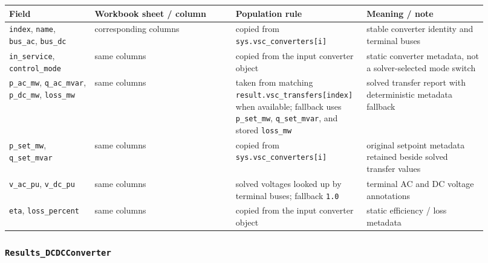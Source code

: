 \begin{longtable}{@{}L{0.17\linewidth}L{0.29\linewidth}L{0.22\linewidth}L{0.24\linewidth}@{}}
\toprule
Field & Workbook sheet / column & Population rule & Meaning / note \\
\midrule
\endhead
\texttt{index}, \texttt{name}, \texttt{bus\_ac}, \texttt{bus\_dc} & corresponding columns & copied from \texttt{sys.vsc\_converters[i]} & stable converter identity and terminal buses \\
\texttt{in\_service}, \texttt{control\_mode} & same columns & copied from the input converter object & static converter metadata, not a solver-selected mode switch \\
\texttt{p\_ac\_mw}, \texttt{q\_ac\_mvar}, \texttt{p\_dc\_mw}, \texttt{loss\_mw} & same columns & taken from matching \texttt{result.vsc\_transfers[index]} when available; fallback uses \texttt{p\_set\_mw}, \texttt{q\_set\_mvar}, and stored \texttt{loss\_mw} & solved transfer report with deterministic metadata fallback \\
\texttt{p\_set\_mw}, \texttt{q\_set\_mvar} & same columns & copied from \texttt{sys.vsc\_converters[i]} & original setpoint metadata retained beside solved transfer values \\
\texttt{v\_ac\_pu}, \texttt{v\_dc\_pu} & same columns & solved voltages looked up by terminal buses; fallback \texttt{1.0} & terminal AC and DC voltage annotations \\
\texttt{eta}, \texttt{loss\_percent} & same columns & copied from the input converter object & static efficiency / loss metadata \\
\bottomrule
\end{longtable}

\subsubsection*{\texttt{Results\_DCDCConverter}}

